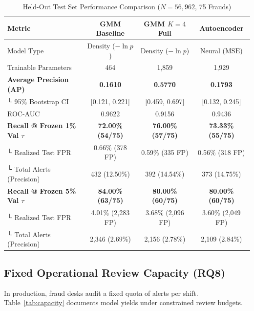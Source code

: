 \documentclass[conference]{IEEEtran}
\begin{document}
\begin{table}[htbp]
\caption{Held-Out Test Set Performance Comparison ($N=56,962$, 75 Frauds)}
\centering
\begin{tabular}{lccc}
\toprule
Metric & GMM Baseline & GMM $K=4$ Full & Autoencoder \\
\midrule
Model Type & Density ($-\ln p$) & Density ($-\ln p$) & Neural ($\text{MSE}$) \\
Trainable Parameters & 464 & 1,859 & 1,929 \\
\textbf{Average Precision (AP)} & \textbf{0.1610} & \textbf{0.5770} & \textbf{0.1793} \\
└ 95\% Bootstrap CI & [0.121, 0.221] & [0.459, 0.697] & [0.132, 0.245] \\
ROC-AUC & 0.9622 & 0.9156 & 0.9436 \\
\midrule
\textbf{Recall @ Frozen 1\% Val $\tau$} & \textbf{72.00\% (54/75)} & \textbf{76.00\% (57/75)} & \textbf{73.33\% (55/75)} \\
└ Realized Test FPR & 0.66\% (378 FP) & 0.59\% (335 FP) & 0.56\% (318 FP) \\
└ Total Alerts (Precision) & 432 (12.50\%) & 392 (14.54\%) & 373 (14.75\%) \\
\midrule
\textbf{Recall @ Frozen 5\% Val $\tau$} & \textbf{84.00\% (63/75)} & \textbf{80.00\% (60/75)} & \textbf{80.00\% (60/75)} \\
└ Realized Test FPR & 4.01\% (2,283 FP) & 3.68\% (2,096 FP) & 3.60\% (2,049 FP) \\
└ Total Alerts (Precision) & 2,346 (2.69\%) & 2,156 (2.78\%) & 2,109 (2.84\%) \\
\bottomrule
\end{tabular}
\label{tab:test_results}
\end{table}

\subsection{Fixed Operational Review Capacity (RQ8)}
In production, fraud desks audit a fixed quota of alerts per shift. Table~\ref{tab:capacity} documents model yields under constrained review budgets.
\end{document}
